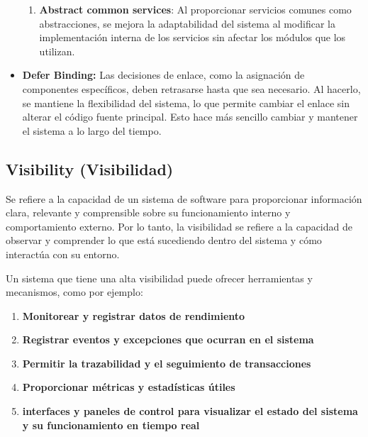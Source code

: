 \documentclass{article}
\begin{document}
\begin{itemize}
\begin{enumerate}
				\item \textbf{Abstract common services}: Al proporcionar servicios comunes como abstracciones, se mejora la adaptabilidad del sistema al modificar la implementación interna de los servicios sin afectar los módulos que los utilizan.
				
			\end{enumerate}	
						\item \textbf{Defer Binding:}
						Las decisiones de enlace, como la asignación de componentes específicos, deben retrasarse hasta que sea necesario. Al hacerlo, se mantiene la flexibilidad del sistema, lo que permite cambiar el enlace sin alterar el código fuente principal. Esto hace más sencillo cambiar y mantener el sistema a lo largo del tiempo.
				
		\end{itemize}
		
		\subsection{Visibility \small{(Visibilidad)} }
		Se refiere a la capacidad de un sistema de software para proporcionar información clara, relevante y comprensible sobre su funcionamiento interno y comportamiento externo. Por lo tanto, la visibilidad se refiere a la capacidad de observar y comprender lo que está sucediendo dentro del sistema y cómo interactúa con su entorno.
		
		Un sistema que tiene una alta visibilidad puede ofrecer herramientas y mecanismos, como por ejemplo: 
		
		\begin{enumerate}
			\item \textbf{Monitorear y registrar datos de rendimiento}
			
			\item \textbf{Registrar eventos y excepciones que ocurran en el sistema}
			
			\item \textbf{Permitir la trazabilidad y el seguimiento de transacciones}
			
			\item \textbf{Proporcionar métricas y estadísticas útiles}
			
			\item \textbf{interfaces y paneles de control para visualizar el estado del sistema y su funcionamiento en tiempo real}
			
		\end{enumerate}	
		
\end{document}
